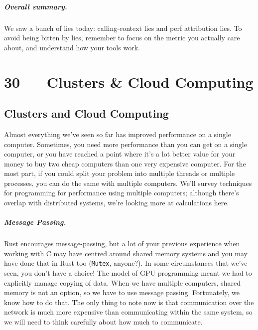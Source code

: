 \documentclass[a4paper]{report}
\begin{document}


\paragraph{Overall summary.} We saw a bunch of lies today: calling-context lies and perf attribution
lies. To avoid being bitten by lies, remember to focus on the metric you actually care about,
and understand how your tools work.










\chapter*{30 --- Clusters \& Cloud Computing}


\section*{Clusters and Cloud Computing}
Almost everything we've seen so far has improved performance on a single
computer. Sometimes, you need more performance than you can get on a
single computer, or you have reached a point where it's a lot better value for
your money to buy two cheap computers than one very expensive computer.
For the most part, if you could split your problem into
multiple threads or multiple processes, you can do the same with multiple
computers. We'll survey techniques for programming for
performance using multiple computers; although there's overlap with
distributed systems, we're looking more at calculations here.

\paragraph*{Message Passing.} Rust encourages message-passing, but
a lot of your previous experience when working with C may have centred around
shared memory systems and you may have done that in Rust too (\texttt{Mutex}, 
anyone?). In some circumstances that we've seen, you don't have a choice!
The model of GPU programming meant we had to explicitly
manage copying of data. When we have multiple computers, shared memory is not
an option, so we have to use message passing. Fortunately, we know how to do
that. The only thing to note now is that communication over the network is
much more expensive than communicating within the same system, so we will
need to think carefully about how much to communicate.
\end{document}
